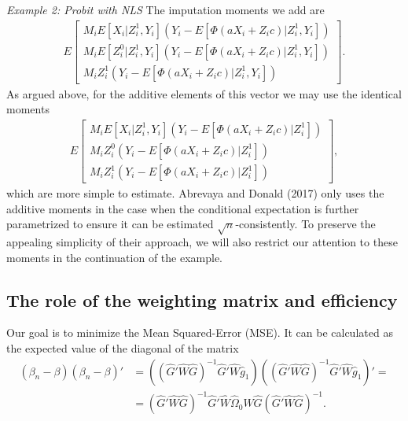 \documentclass{article}
\theoremstyle{definition}
\theoremstyle{remark}
\begin{document}
\emph{Example 2: Probit with NLS}
The imputation moments we add are
\begin{align}
E\left[\begin{array}{c}
M_i E[X_i|Z^1_i, Y_i](Y_i-E[\Phi(aX_i+Z_ic)|Z_i^1,Y_i])\\
M_i E[Z_i^0|Z^1_i, Y_i](Y_i-E[\Phi(aX_i+Z_ic)|Z_i^1,Y_i]) \\
M_i Z^1_i(Y_i-E[\Phi(aX_i+Z_ic)|Z_i^1,Y_i])
\end{array}
\right].
\end{align}
As argued above, for the additive elements of this vector we may use the identical moments
\begin{align}
E\left[\begin{array}{c}
M_i E[X_i|Z^1_i, Y_i](Y_i-E[\Phi(aX_i+Z_ic)|Z_i^1])\\
M_i Z_i^0(Y_i-E[\Phi(aX_i+Z_ic)|Z_i^1]) \\
M_i Z^1_i(Y_i-E[\Phi(aX_i+Z_ic)|Z_i^1])
\end{array}
\right],
\end{align}
which are more simple to estimate. Abrevaya and Donald (2017) only uses the additive moments in the case when the conditional expectation is further parametrized to ensure it can be estimated $\sqrt{n}$-consistently. To preserve the appealing simplicity of their approach, we will also restrict our attention to these moments in the continuation of the example.



\subsection{The role of the weighting matrix and efficiency}
Our goal is to minimize the Mean Squared-Error (MSE). It can be calculated as the expected value of the diagonal of the matrix
\begin{align}
(\beta_n -\beta)(\beta_n -\beta)'&=((\hat{G}'\hat{W}\hat{G})^{-1}\hat{G}'\hat{W}\hat{g}_1)((\hat{G}'\hat{W}\hat{G})^{-1}\hat{G}'\hat{W}\hat{g}_1)'= \\
&= (\hat{G}'\hat{W}\hat{G})^{-1} \hat{G}'\hat{W} \hat{\Omega}_0 \hat{W} \hat{G} (\hat{G}'\hat{W}\hat{G})^{-1}. \nonumber
\end{align}
\end{document}
